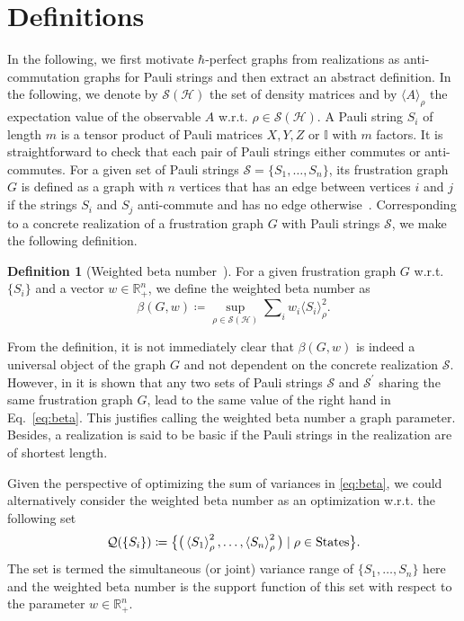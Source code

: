 \documentclass[
12pt,
prx,
aps,
reprint,
a4paper,
longbibliograph,
nofootinbib,
nobibnotes,
superscriptaddress
]{revtex4-2}
\theoremstyle{definition}
\newtheorem{definition}[theorem]{Definition}
\newcommand\mean[1]{\left\langle #1 \right\rangle}
\def\id{\mathbb{I}}%
\begin{document}
\section{Definitions}
\label{sec:def}
In the following, we first motivate $\hbar$-perfect graphs from realizations as anti-commutation graphs for Pauli strings and then extract an abstract definition. In the following, we denote by $\mathcal{S}(\mathcal{H})$ the set of density matrices and by $\langle A \rangle_\rho$ the expectation value of the observable $A$ w.r.t. $\rho \in \mathcal{S}(\mathcal{H})$. A Pauli string $S_i$ of length $m$ is a tensor product of Pauli matrices $X, Y, Z$ or $\id$ with $m$ factors. It is straightforward to check that each pair of Pauli strings either commutes or anti-commutes. 
For a given set of Pauli strings $\mathcal{S}=\{S_1,\dots,S_n\}$, its frustration graph $G$ is defined as a graph with $n$ vertices that has an edge between vertices $i$ and $j$ if the strings $S_i$ and $S_j$ anti-commute and has no edge otherwise~\cite{chapman2020characterization}. Corresponding to a concrete realization of a frustration graph $G$ with Pauli strings $\mathcal{S}$, we make the following definition.

\begin{definition}[Weighted beta number~\cite{xu2023bounding}] 
For a given frustration graph $G$ w.r.t. $\{S_i\}$ and a vector $w \in \mathbb{R}^n_+$, we define the weighted beta number as %
	\begin{equation}\label{eq:beta}
        \beta(G,w) \coloneqq  \sup_{\rho \in \mathcal{S}(\mathcal{H})} \sum\nolimits_{i} w_i\langle S_i \rangle_\rho^2.
    \end{equation}
\end{definition}
From the definition, it is not immediately clear that $\beta(G,w)$ is indeed a universal object of the graph $G$ and not dependent on the concrete realization $\mathcal{S}$. 
However, in \cite{xu2023bounding}  it is shown that any two sets of Pauli strings $\mathcal{S}$ and $\mathcal{S}^\prime$ sharing the same frustration graph $G$, lead to the same value of the right hand in Eq.~\eqref{eq:beta}. This justifies calling the weighted beta number a graph parameter. Besides, a realization is said to be basic if the Pauli strings in the realization are of shortest length.

Given the perspective of optimizing the sum of variances in \eqref{eq:beta}, we could alternatively consider the weighted beta number as an optimization w.r.t. the following set
    \begin{equation}
	    {\cal Q}(\{S_i\}) \coloneqq \big\{ \big(\mean{S_1}_{\rho}^2, \dots, \mean{S_n}_{\rho}^2\big) \mid \rho\in \text{States} \big\}.
   \end{equation}
The set is termed the simultaneous (or joint) variance range of $\{S_1,\ldots,S_n\}$ here and the weighted beta number is the support function of this set with respect to the parameter $w \in \mathbb{R}^n_+$.
\end{document}
